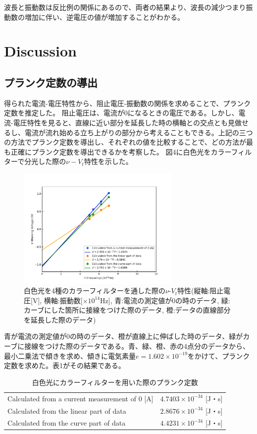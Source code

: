 \documentclass[a4paper,12pt]{jsarticle}
\begin{document}
波長と振動数は反比例の関係にあるので、両者の結果より、波長の減少つまり振動数の増加に伴い、逆電圧の値が増加することがわかる。

\clearpage
\section{Discussion}
\subsection{プランク定数の導出}
得られた電流-電圧特性から、阻止電圧-振動数の関係を求めることで、プランク定数を推定した。
阻止電圧は、電流が0になるときの電圧である。しかし、電流-電圧特性を見ると、直線に近い部分を延長した時の横軸との交点とも見做せるし、電流が流れ始める立ち上がりの部分から考えることもできる。上記の三つの方法でプランク定数を導出し、それぞれの値を比較することで、どの方法が最も正確にプランク定数を導出できるかを考察した。
図4に白色光をカラーフィルターで分光した際の$\nu-V_t$特性を示した。
\begin{figure}[H]
\centering
\includegraphics[width=0.7\textwidth]{figs/fitting.pdf}
\caption{白色光を4種のカラーフィルターを通した際の$\nu$-$V_t$特性(縦軸:阻止電圧[V], 横軸:振動数[$\times 10^{14}$Hz], 青:電流の測定値が0の時のデータ, 緑:カーブにした箇所に接線をつけた際のデータ, 橙:データの直線部分を延長した際のデータ)}
\end{figure}
青が電流の測定値が0の時のデータ、橙が直線上に伸ばした時のデータ、緑がカーブに接線をつけた際のデータである。青、緑、橙、赤の4点分のデータから、最小二乗法で傾きを求め、傾きに電気素量$e = 1.602\times 10^{-19}$をかけて、プランク定数を求めた。表1がその結果である。
\begin{table}[htbp]
  \centering
  \caption{白色光にカラーフィルターを用いた際のプランク定数}
    \begin{tabular}{ll}
    \toprule
    Calculated from a current measurement of 0 [A] & $4.7403\times 10^{-34}$ [J・s] \\
    Calculated from the linear part of data & $2.8676\times 10^{-34}$ [J・s] \\
    Calculated from the curve part of data & $4.4231\times 10^{-34}$ [J・s] \\
    \bottomrule
    \end{tabular}%
  \label{tab:addlabel}%
\end{table}%
\end{document}
